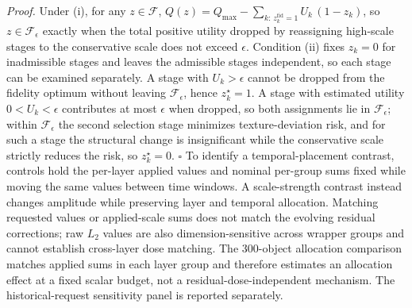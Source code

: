\documentclass[times,twocolumn,final]{elsarticle}
\providecommand{\DIFadd}[1]{{\protect\color{blue} \sf #1}} %
\providecommand{\DIFdel}[1]{{\protect\color{red} \scriptsize #1}} %
\providecommand{\DIFaddbegin}{} %
\providecommand{\DIFaddend}{} %
\providecommand{\DIFdelbegin}{} %
\providecommand{\DIFdelend}{} %
\begin{document}
\DIFdelbegin %
\DIFdel{\textit{Proof.} Under (i), for any $z\in\mathcal{F}$, $Q(z)=Q_{\max}-\sum_{k:\,z_k^{\mathrm{fid}}=1}U_k\,(1-z_k)$, so $z\in\mathcal{F}_\epsilon$ exactly when the total positive utility dropped by reassigning high-scale stages to the conservative scale does not exceed $\epsilon$. Condition (ii) fixes $z_k=0$ for inadmissible stages and leaves the admissible stages independent, so each stage can be examined separately. A stage with $U_k>\epsilon$ cannot be dropped from the fidelity optimum without leaving $\mathcal{F}_\epsilon$, hence $z_k^{\star}=1$. A stage with estimated utility $0<U_k<\epsilon$ contributes at most $\epsilon$ when dropped, so both assignments lie in $\mathcal{F}_\epsilon$; within $\mathcal{F}_\epsilon$ the second selection stage minimizes texture-deviation risk, and for such a stage the structural change is insignificant while the conservative scale strictly reduces the risk, so $z_k^{\star}=0$. }%
\DIFdel{$\square$
}%
\DIFdelend \DIFaddbegin \DIFadd{To identify a temporal-placement contrast, controls hold the per-layer applied values and nominal per-group sums fixed while moving the same values between time windows. A scale-strength contrast instead changes amplitude while preserving layer and temporal allocation. Matching requested values or applied-scale sums does not match the evolving residual corrections; raw $L_2$ values are also dimension-sensitive across wrapper groups and cannot establish cross-layer dose matching. The 300-object allocation comparison matches applied sums in each layer group and therefore estimates an allocation effect at a fixed scalar budget, not a residual-dose-independent mechanism. The historical-request sensitivity panel is reported separately.
}\DIFaddend 
\end{document}
